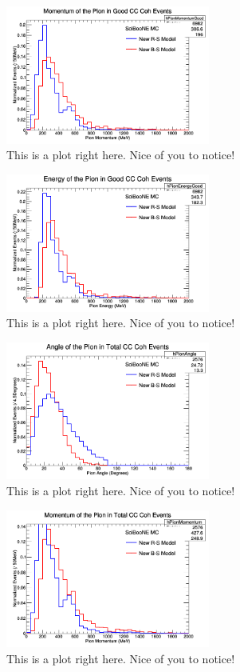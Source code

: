 \documentclass[11pt]{article}
\begin{document}
\begin{figure}[H]
\centering
\includegraphics[width=0.6\textwidth]{ANMPionPlottingImages/8-ANMPionPlotting.png}
\caption{This is a plot right here. Nice of you to notice!}
\end{figure}

\begin{figure}[H]
\centering
\includegraphics[width=0.6\textwidth]{ANMPionPlottingImages/9-ANMPionPlotting.png}
\caption{This is a plot right here. Nice of you to notice!}
\end{figure}

\begin{figure}[H]
\centering
\includegraphics[width=0.6\textwidth]{ANMPionPlottingImages/10-ANMPionPlotting.png}
\caption{This is a plot right here. Nice of you to notice!}
\end{figure}

\begin{figure}[H]
\centering
\includegraphics[width=0.6\textwidth]{ANMPionPlottingImages/11-ANMPionPlotting.png}
\caption{This is a plot right here. Nice of you to notice!}
\end{figure}
\end{document}
